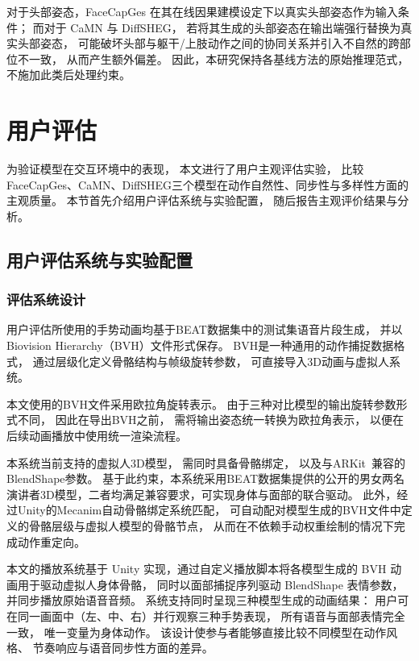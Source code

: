 对于头部姿态，FaceCapGes 在其在线因果建模设定下以真实头部姿态作为输入条件；
而对于 CaMN 与 DiffSHEG，
若将其生成的头部姿态在输出端强行替换为真实头部姿态，
可能破坏头部与躯干/上肢动作之间的协同关系并引入不自然的跨部位不一致，
从而产生额外偏差。
因此，本研究保持各基线方法的原始推理范式，不施加此类后处理约束。

\section{用户评估}
\label{sec:userstudy}

为验证模型在交互环境中的表现，
本文进行了用户主观评估实验，
比较FaceCapGes、CaMN\cite{beatcamn}、DiffSHEG\cite{diffsheg}三个模型在动作自然性、同步性与多样性方面的主观质量。
本节首先介绍用户评估系统与实验配置，
随后报告主观评价结果与分析。

\subsection{用户评估系统与实验配置}

\subsubsection{评估系统设计}
用户评估所使用的手势动画均基于BEAT数据集中的测试集语音片段生成，
并以Biovision Hierarchy（BVH）文件形式保存。
BVH是一种通用的动作捕捉数据格式，
通过层级化定义骨骼结构与帧级旋转参数，
可直接导入3D动画与虚拟人系统。

本文使用的BVH文件采用欧拉角旋转表示。
由于三种对比模型的输出旋转参数形式不同，
因此在导出BVH之前，
需将输出姿态统一转换为欧拉角表示，
以便在后续动画播放中使用统一渲染流程。

本系统当前支持的虚拟人3D模型，
需同时具备骨骼绑定，
以及与ARKit~\cite{ARKitDocumentation}兼容的BlendShape参数。
基于此约束，本系统采用BEAT数据集提供的公开的男女两名演讲者3D模型，二者均满足兼容要求，可实现身体与面部的联合驱动。
此外，经过Unity\cite{unity}的Mecanim\cite{unitymechanim}自动骨骼绑定系统匹配，
可自动配对模型生成的BVH文件中定义的骨骼层级与虚拟人模型的骨骼节点，
从而在不依赖手动权重绘制的情况下完成动作重定向。

本文的播放系统基于 Unity 实现，通过自定义播放脚本将各模型生成的 BVH 动画用于驱动虚拟人身体骨骼，
同时以面部捕捉序列驱动 BlendShape 表情参数，并同步播放原始语音音频。
系统支持同时呈现三种模型生成的动画结果：
用户可在同一画面中（左、中、右）并行观察三种手势表现，
所有语音与面部表情完全一致，
唯一变量为身体动作。
该设计使参与者能够直接比较不同模型在动作风格、
节奏响应与语音同步性方面的差异。


